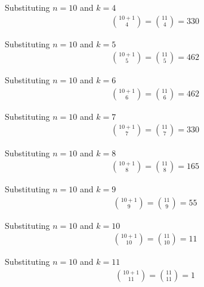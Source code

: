 \documentclass[12pt]{article}
\begin{document}
    Substituting $n=10$ and $k = 4$ 
    \begin{equation}
        \begin{split}
            \binom{10+1}{4}=\binom{11}{4}=330
        \end{split}
    \end{equation}


    Substituting $n=10$ and $k = 5$ 
    \begin{equation}
        \begin{split}
            \binom{10+1}{5}=\binom{11}{5}=462
        \end{split}
    \end{equation}


    Substituting $n=10$ and $k = 6$ 
    \begin{equation}
        \begin{split}
            \binom{10+1}{6}=\binom{11}{6}=462
        \end{split}
    \end{equation}


    Substituting $n=10$ and $k = 7$ 
    \begin{equation}
        \begin{split}
            \binom{10+1}{7}=\binom{11}{7}=330
        \end{split}
    \end{equation}


    Substituting $n=10$ and $k = 8$ 
    \begin{equation}
        \begin{split}
            \binom{10+1}{8}=\binom{11}{8}=165
        \end{split}
    \end{equation}


    Substituting $n=10$ and $k = 9$ 
    \begin{equation}
        \begin{split}
            \binom{10+1}{9}=\binom{11}{9}=55
        \end{split}
    \end{equation}


    Substituting $n=10$ and $k = 10$ 
    \begin{equation}
        \begin{split}
            \binom{10+1}{10}=\binom{11}{10}=11
        \end{split}
    \end{equation}


    Substituting $n=10$ and $k = 11$ 
    \begin{equation}
        \begin{split}
            \binom{10+1}{11}=\binom{11}{11}=1
        \end{split}
    \end{equation}
    
\end{document}
